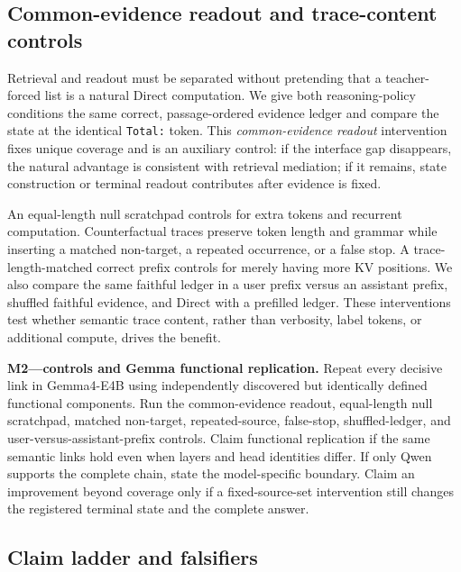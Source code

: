 \subsection{Common-evidence readout and trace-content controls}

Retrieval and readout must be separated without pretending that a
teacher-forced list is a natural Direct computation. We give both
reasoning-policy conditions the same correct, passage-ordered evidence ledger
and compare the state at the identical \texttt{Total:} token. This
\emph{common-evidence readout} intervention fixes unique coverage and is an
auxiliary control: if the interface gap disappears, the natural advantage is
consistent with retrieval mediation; if it remains, state construction or
terminal readout contributes after evidence is fixed.

An equal-length null scratchpad controls for extra tokens and recurrent
computation. Counterfactual traces preserve token length and grammar while
inserting a matched non-target, a repeated occurrence, or a false stop. A
trace-length-matched correct prefix controls for merely having more KV
positions. We also compare the same faithful ledger in a user prefix versus an
assistant prefix, shuffled faithful evidence, and Direct with a prefilled
ledger. These interventions test whether semantic trace content, rather than
verbosity, label tokens, or additional compute, drives the benefit.

\begin{todobox}
\textbf{M2---controls and Gemma functional replication.}
Repeat every decisive link in Gemma4-E4B using independently discovered but
identically defined functional components. Run the common-evidence readout,
equal-length null scratchpad, matched non-target, repeated-source, false-stop,
shuffled-ledger, and user-versus-assistant-prefix controls. Claim functional
replication if the same semantic links hold even when layers and head
identities differ. If only Qwen supports the complete chain, state the
model-specific boundary. Claim an improvement beyond coverage only if a
fixed-source-set intervention still changes the registered terminal state and
the complete answer.
\end{todobox}

\subsection{Claim ladder and falsifiers}


